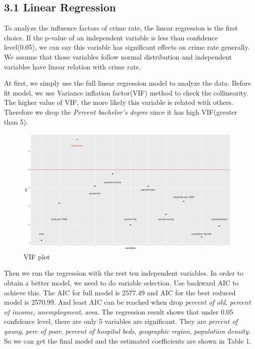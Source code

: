 \documentclass[oneside,11pt]{homework}
\begin{document}
\subsection*{3.1 Linear Regression}

To analyze the influence factors of crime rate, the linear regression is the first choice. If the p-value of an independent variable is less than confidence level(0.05), we can say this variable has significant effects on crime rate generally.  We assume that those variables follow normal distribution and independent variables have linear relation with crime rate. \par

At first, we simply use the full linear regression model to analyze the data. Before fit model, we use Variance inflation factor(VIF) method to check the collinearity. The higher value of VIF, the more likely this variable is related with others. Therefore we drop the \textit{Percent bachelor’s degree} since it has high VIF(greater than 5).\par
\begin{figure}[H]
\centering
\includegraphics[scale=0.35]{VIF.png}
\caption{VIF plot} 
\end{figure}

Then we run the regression with the rest ten independent variables. In order to obtain a better model, we need to do variable selection. Use backward AIC to achieve this. The AIC for full model is 2577.49 and AIC for the best reduced model is 2570.99. And least AIC can be reached when drop \textit{percent of old}, \textit{percent of income}, \textit{unemployment}, \textit{area}. The regression result shows that under 0.05 confidence level, there are only 5 variables are significant. They are \textit{percent of young}, \textit{perc of poor}, \textit{percent of hospital beds}, \textit{geographic region}, \textit{population density}. So we can get the final model and the estimated coefficients are shown in Table 1.\par
\end{document}
